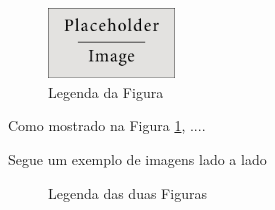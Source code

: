         \begin{figure}[htbp!]
            \centering
            \includegraphics[width=0.3\textwidth]{capitulo exemplos/Imagens/exemplo_figura.jpg}
            \caption{Legenda da Figura}
            \label{fig:ref}
        \end{figure}


Como mostrado na Figura \ref{fig:ref}, ....





            
            Segue um exemplo de imagens lado a lado


            \begin{figure}[H]
                \centering
                \hfill
                \caption{Legenda das duas Figuras}
                \label{fig:ref3}
            \end{figure}
            

